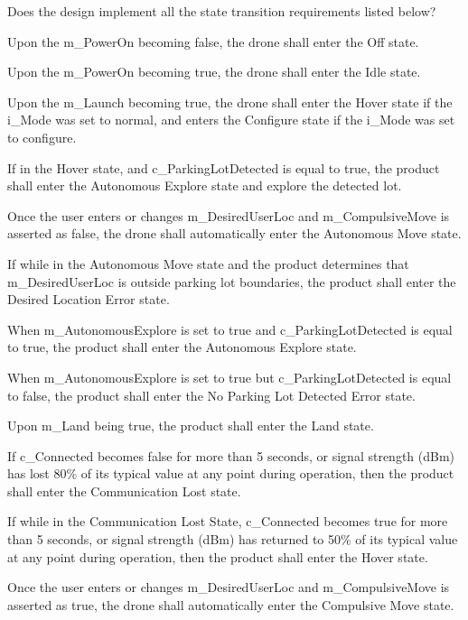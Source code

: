 \documentclass[12pt, titlepage]{article}
\begin{document}
\begin{todolist}
\begin{todolist}
\end{todolist}
\item Does the design implement all the state transition requirements listed below?
\begin{todolist}
    \item Upon the m\_PowerOn becoming false, the drone shall enter the Off state.
    \item Upon the m\_PowerOn becoming true, the drone shall enter the Idle state.
    \item Upon the m\_Launch becoming true, the drone shall enter the Hover state if the i\_Mode was set to normal, and enters the Configure state if the i\_Mode was set to configure.
    \item If in the Hover state, and c\_ParkingLotDetected is equal to true, the product shall enter the Autonomous Explore state and explore the detected lot.
    \item Once the user enters or changes m\_DesiredUserLoc and m\_CompulsiveMove is asserted as false, the drone shall automatically enter the Autonomous Move state.
    \item If while in the Autonomous Move state and the product determines that m\_DesiredUserLoc is outside parking lot boundaries, the product shall enter the Desired Location Error state.
    \item When m\_AutonomousExplore is set to true and c\_ParkingLotDetected is equal to true, the product shall enter the Autonomous Explore state.
    \item When m\_AutonomousExplore is set to true but c\_ParkingLotDetected is equal to false, the product shall enter the No Parking Lot Detected Error state.
    \item Upon m\_Land being true, the product shall enter the Land state.
    \item If c\_Connected becomes false for more than 5 seconds, or signal strength (dBm) has lost 80\% of its typical value at any point during operation, then the product shall enter the Communication Lost state.
    \item If while in the Communication Lost State, c\_Connected becomes true for more than 5 seconds, or signal strength (dBm) has returned to 50\% of its typical value at any point during operation, then the product shall enter the Hover state.
    \item Once the user enters or changes m\_DesiredUserLoc and m\_CompulsiveMove is asserted as true, the drone shall automatically enter the Compulsive Move state.
\end{todolist}
\end{todolist}
\end{document}
